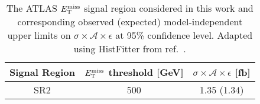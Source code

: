 \begin{table}[!htbp]
  \begin{center}
    \begin{tabular}{c|c|c}
      \hline
      \hline
      Signal Region & $E_{\mathrm{T}}^{\mathrm{miss}}$ threshold [GeV] & $\sigma \times \mathcal{A} \times \epsilon$ [fb] \\
      \hline
      SR2 & 500 & 1.35 (1.34) \\
      \hline
      \hline
    \end{tabular}
  \end{center}
  \caption{The ATLAS \monoWZ $E_{\mathrm{T}}^{\mathrm{miss}}$ signal region considered in this work and corresponding observed (expected) model-independent upper limits on $\sigma \times \mathcal{A} \times \epsilon$ at 95\% confidence level. Adapted using HistFitter from ref.~\cite{Aad:2013monoWZ}.}
  \label{tab:sigmalim_monoWZ}
\end{table}
